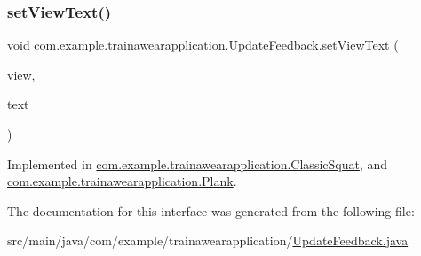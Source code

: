 \subsubsection{\texorpdfstring{setViewText()}{setViewText()}}
{\footnotesize\ttfamily void com.\+example.\+trainawearapplication.\+Update\+Feedback.\+set\+View\+Text (\begin{DoxyParamCaption}\item[{Text\+View}]{view,  }\item[{String}]{text }\end{DoxyParamCaption})}



Implemented in \mbox{\hyperlink{classcom_1_1example_1_1trainawearapplication_1_1_classic_squat_ab193e39e2f1255fd88d0508cfe7a63ff}{com.\+example.\+trainawearapplication.\+Classic\+Squat}}, and \mbox{\hyperlink{classcom_1_1example_1_1trainawearapplication_1_1_plank_a4d4a46b71ced8fe89023ccbf14d17f77}{com.\+example.\+trainawearapplication.\+Plank}}.



The documentation for this interface was generated from the following file\+:\begin{DoxyCompactItemize}
\item 
src/main/java/com/example/trainawearapplication/\mbox{\hyperlink{_update_feedback_8java}{Update\+Feedback.\+java}}\end{DoxyCompactItemize}
